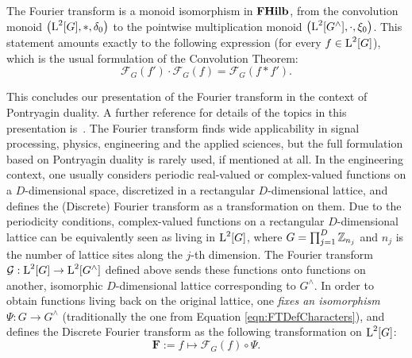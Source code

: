 \begin{theorem}
The Fourier transform is a monoid isomorphism in $\mathbf{FHilb}$, from the convolution monoid $\left( \operatorname{L}^2[G],*,\delta_0 \right)$ to the pointwise multiplication monoid $\left( \operatorname{L}^2[G^\wedge],\cdot, \xi_0 \right)$. This statement amounts exactly to the following expression (for every $f\in \operatorname{L}^2[G]$), which is the usual formulation of the Convolution Theorem: 
\begin{equation}\label{eqn:ConvolutionTheorem}
  \mathcal{F}_G (f') \cdot \mathcal{F}_G (f) = \mathcal{F}_G (f * f').
\end{equation}
\end{theorem}

This concludes our presentation of the Fourier transform in the context of Pontryagin duality. A further reference for details of the topics in this presentation is~\cite{rudin1962fourier}. The Fourier transform finds wide applicability in signal processing, physics, engineering and the applied sciences, but the full formulation based on Pontryagin duality is rarely used, if mentioned at all. In the engineering context, one usually considers periodic real-valued or complex-valued functions on a $D$-dimensional space, discretized in a rectangular $D$-dimensional lattice, and defines the (Discrete) Fourier transform as a transformation on them. Due to the periodicity conditions, complex-valued functions on a rectangular $D$-dimensional lattice can be equivalently seen as living in $\operatorname{L}^2[G]$, where $G = \prod_{j=1}^D \mathbb{Z}_{n_j}$ and $n_j$ is the number of lattice sites along the $j$-th dimension. The  Fourier transform $\mathcal{G} : \operatorname{L}^2[G] \rightarrow \operatorname{L}^2[G^\wedge]$ defined above sends these functions onto functions on another, isomorphic $D$-dimensional lattice corresponding to $G^\wedge$. In order to obtain functions living back on the original lattice, one \emph{fixes an isomorphism} $\Psi : G \rightarrow G^\wedge$ (traditionally the one from Equation \ref{eqn:FTDefCharacters}), and defines the Discrete Fourier transform as the following transformation on $\operatorname{L}^2[G]$:
\begin{equation}\label{eqn:FTDefDFT}
  \mathbf{F} := f \mapsto \mathcal{F}_G(f) \circ \Psi.
\end{equation}

